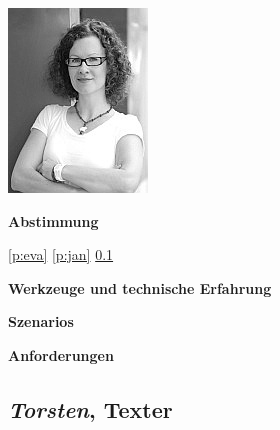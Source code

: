 \begin{multicols}{2}

\begin{center}
\includegraphics[width=0.5\columnwidth]{media/lotte.jpg}
\end{center}


\textbf{Abstimmung}

\ref{p:eva}
\ref{p:jan}
\ref{p:torsten}

\textbf{Werkzeuge und technische Erfahrung}

\columnbreak

\textbf{Szenarios}

\textbf{Anforderungen}

\end{multicols}

\pagebreak

\subsection{\emph{Torsten}, Texter}\label{p:torsten}

